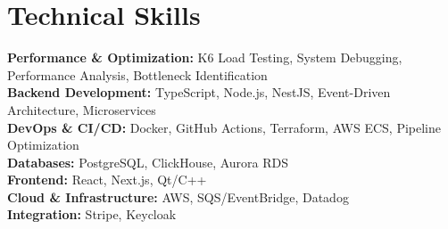 \documentclass[11pt,a4paper]{article}
\begin{document}
\section{Technical Skills}

\textbf{Performance \& Optimization:} K6 Load Testing, System Debugging, Performance Analysis, Bottleneck Identification\\[0.4em]
\textbf{Backend Development:} TypeScript, Node.js, NestJS, Event-Driven Architecture, Microservices\\[0.4em]
\textbf{DevOps \& CI/CD:} Docker, GitHub Actions, Terraform, AWS ECS, Pipeline Optimization\\[0.4em]
\textbf{Databases:} PostgreSQL, ClickHouse, Aurora RDS\\[0.4em]
\textbf{Frontend:} React, Next.js, Qt/C++\\[0.4em]
\textbf{Cloud \& Infrastructure:} AWS, SQS/EventBridge, Datadog\\[0.4em]
\textbf{Integration:} Stripe, Keycloak
\end{document}
